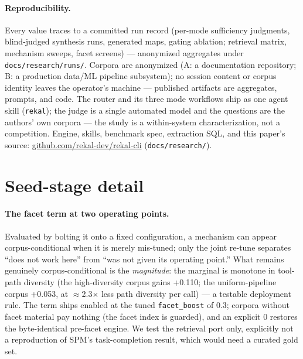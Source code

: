 \documentclass[twocolumn,10pt]{article}
\newcommand{\code}[1]{\texttt{#1}}
\newcommand{\x}{$\times$}
\begin{document}
\paragraph{Reproducibility.}
Every value traces to a committed run record (per-mode sufficiency judgments, blind-judged synthesis runs, generated maps, gating ablation; retrieval matrix, mechanism sweeps, facet screens) --- anonymized aggregates under \code{docs/research/runs/}. Corpora are anonymized (A: a documentation repository; B: a production data/ML pipeline subsystem); no session content or corpus identity leaves the operator's machine --- published artifacts are aggregates, prompts, and code. The router and its three mode workflows ship as one agent skill (\code{rekal}); the judge is a single automated model and the questions are the authors' own corpora --- the study is a within-system characterization, not a competition. Engine, skills, benchmark spec, extraction SQL, and this paper's source: \href{https://github.com/rekal-dev/rekal-cli}{github.com/rekal-dev/rekal-cli} (\code{docs/research/}).

\appendix

\section{Seed-stage detail}\label{app:seed}

\paragraph{The facet term at two operating points.}
Evaluated by bolting it onto a fixed configuration, a mechanism can appear corpus-conditional when it is merely mis-tuned; only the joint re-tune separates ``does not work here'' from ``was not given its operating point.'' What remains genuinely corpus-conditional is the \emph{magnitude}: the marginal is monotone in tool-path diversity (the high-diversity corpus gains +0.110; the uniform-pipeline corpus +0.053, at $\approx$2.3\x{} less path diversity per call) --- a testable deployment rule. The term ships enabled at the tuned \code{facet\_boost} of 0.3; corpora without facet material pay nothing (the facet index is guarded), and an explicit 0 restores the byte-identical pre-facet engine. We test the retrieval port only, explicitly not a reproduction of SPM's task-completion result, which would need a curated gold set.
\end{document}
